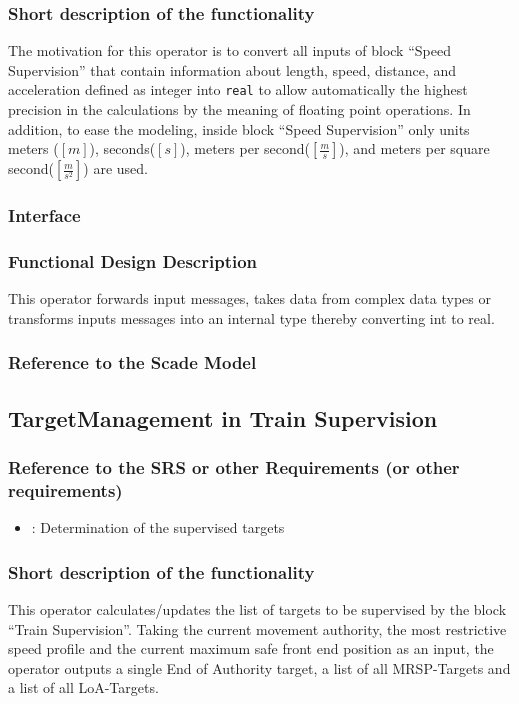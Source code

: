 \subsubsection{Short description of the functionality}
The motivation for this operator is to convert all inputs of block ``Speed Supervision'' that contain information about length, speed, distance, and acceleration defined as integer into \texttt{real} to allow automatically the highest precision in the calculations by the meaning of floating point operations. In addition, to ease the modeling, inside block ``Speed Supervision'' only units meters ($[m]$), seconds($[s]$), meters per second($[\frac{m}{s}]$), and meters per square second($[\frac{m}{s^{2}}]$) are used.

\subsubsection{Interface}

\subsubsection{Functional Design Description}
This operator forwards input messages, takes data from complex data types or transforms inputs messages into an internal type thereby converting int to real.
  
\subsubsection{Reference to the Scade Model}

\subsection{TargetManagement in Train Supervision}

\subsubsection{Reference to the SRS or other Requirements (or other requirements)}
\begin{itemize}
	\item \cite[Chapt.~3.13.8.2]{subset-026}: Determination of the supervised targets 
\end{itemize}

\subsubsection{Short description of the functionality}
This operator calculates/updates the list of targets to be supervised by the block ``Train Supervision''. Taking the current movement authority, the most restrictive speed profile and the current maximum safe front end position as an input, the operator outputs a single End of Authority target, a list of all MRSP-Targets and a list of all LoA-Targets.
  
